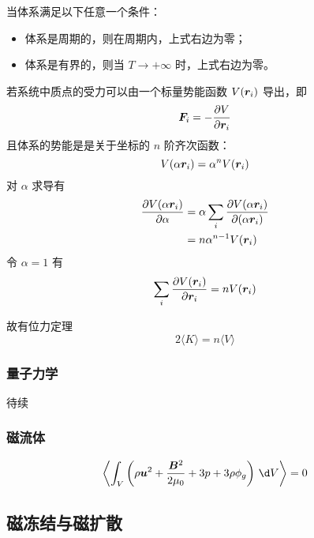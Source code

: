 当体系满足以下任意一个条件：
\begin{itemize}
    \item 体系是周期的，则在周期内，上式右边为零；
    \item 体系是有界的，则当 $T \to + \infty$ 时，上式右边为零。
\end{itemize}

若系统中质点的受力可以由一个标量势能函数 $V({\bm{r}_i})$ 导出，即
\begin{equation}
    \bm{F}_i = - \frac{\partial {V}}{\partial {\bm{r}_i}}
\end{equation}
且体系的势能是是关于坐标的 $n$ 阶齐次函数：
\begin{equation}
    V({\alpha \bm{r}_i}) = \alpha^n V({\bm{r}_i})
\end{equation}
对 $\alpha$ 求导有
\begin{equation}\begin{aligned}
\frac{\partial {V({\alpha \bm{r}_i})}}{\partial {\alpha}} &= \alpha \sum_i \frac{\partial {V({\alpha \bm{r}_i})}}{\partial {(\alpha \bm{r}_i)}} \\
&= n \alpha^{n-1} V({\bm{r}_i})
\end{aligned}\end{equation}
令 $\alpha = 1$ 有
\begin{equation}
    \sum_i \frac{\partial {V({\bm{r}_i})}}{\partial {\bm{r}_i}} = n V({\bm{r}_i})
\end{equation}

故有位力定理
\begin{equation}
    2 \langle K \rangle = n \langle V \rangle
\end{equation}

\subsubsection{量子力学}

待续

\subsubsection{磁流体}

\begin{equation}
\left\langle \int_V \left(
    \rho \vector{u}^2 + \frac{\vector{B}^2}{2 \mu_0} + 3 p + 3 \rho \phi_g
\right) \, \d V \right\rangle = 0
\end{equation}

\subsection{磁冻结与磁扩散}

